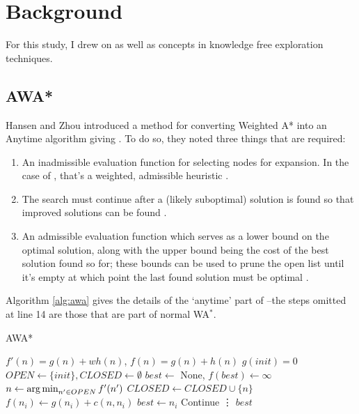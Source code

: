 \section{Background}
For this study, I drew on \awa as well as concepts in knowledge free exploration techniques.

\subsection{AWA*}
Hansen and Zhou introduced a method for converting Weighted A* into an Anytime algorithm giving \awa \cite{hansen2007anytime}. To do so, they noted three things that are required:

\begin{enumerate}
    \item An inadmissible evaluation function for selecting nodes for expansion. In the case of \awa, that's a weighted, admissible heuristic \cite{hansen2007anytime}.
    \item The search must continue after a (likely suboptimal) solution is found so that improved solutions can be found \cite{hansen2007anytime}.
    \item An admissible evaluation function which serves as a lower bound on the optimal solution, along with the upper bound being the cost of the best solution found so for; these bounds can be used to prune the open list until it's empty at which point the last found solution must be optimal \cite{hansen2007anytime}.
\end{enumerate}

Algorithm \ref{alg:awa} gives the details of the `anytime' part of \awa--the steps omitted at line 14 are those that are part of normal WA$^*$.

\begin{algorithm}
\caption{AWA*}\label{alg:awa}
\begin{algorithmic}[1]
\Require $f'(n)=g(n)+wh(n)$, $f(n)=g(n)+h(n)$
\State $g(init) = 0$
\State $OPEN \gets \{init\}, CLOSED \gets \emptyset$
\State $best \gets $ None, $f(best) \gets \infty$ 
    \State $n \gets \operatorname*{arg\,min}_{n' \in OPEN}f'(n')$
        \State $CLOSED \gets CLOSED \cup \{n\}$ 
                \State $f(n_i) \gets g(n_i)+c(n,n_i)$ 
                \State $best \gets n_i$  
                \State Continue
            \EndIf
            \State \vdots
        \EndFor
    \EndIf
\EndWhile
\State \Return $best$
\end{algorithmic}
\end{algorithm}

